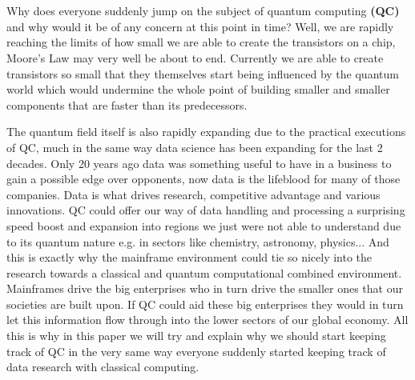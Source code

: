 
\chapter{}
\label{ch:inleiding}

Why does everyone suddenly jump on the subject of quantum computing \textbf{(QC)} and why would it be of any concern at this point in time? Well, we are rapidly reaching the limits of how small we are able to create the transistors on a chip, Moore's Law may very well be about to end. Currently we are able to create transistors so small that they themselves start being influenced by the quantum world which would undermine the whole point of building smaller and smaller components that are faster than its predecessors. \autocite{Hartnett2019}

The quantum field itself is also rapidly expanding due to the practical executions of QC, much in the same way data science has been expanding for the last 2 decades. Only 20 years ago data was something useful to have in a business to gain a possible edge over opponents, now data is the lifeblood for many of those companies. Data is what drives research, competitive advantage and various innovations. QC could offer our way of data handling and processing a surprising speed boost and expansion into regions we just were not able to understand due to its quantum nature e.g. in sectors like chemistry, astronomy, physics...  And this is exactly why the mainframe environment could tie so nicely into the research towards a classical and quantum computational combined environment. Mainframes drive the big enterprises who in turn drive the smaller ones that our societies are built upon. If QC could aid these big enterprises they would in turn let this information flow through into the lower sectors of our global economy. All this is why in this paper we will try and explain why we should start keeping track of QC in the very same way everyone suddenly started keeping track of data research with classical computing.~\autocite{Google2019} ~\autocite{IBM2019}


\section{}
\label{sec:probleemstelling}

